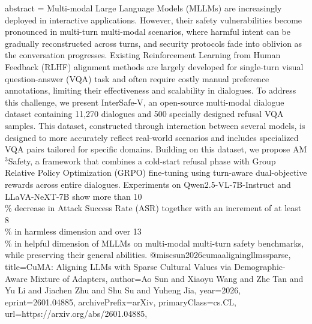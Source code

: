 {      abstract = {Multi-modal Large Language Models (MLLMs) are increasingly deployed in interactive applications. However, their safety vulnerabilities become pronounced in multi-turn multi-modal scenarios, where harmful intent can be gradually reconstructed across turns, and security protocols fade into oblivion as the conversation progresses. Existing Reinforcement Learning from Human Feedback (RLHF) alignment methods are largely developed for single-turn visual question-answer (VQA) task and often require costly manual preference annotations, limiting their effectiveness and scalability in dialogues. To address this challenge, we present InterSafe-V, an open-source multi-modal dialogue dataset containing 11,270 dialogues and 500 specially designed refusal VQA samples. This dataset, constructed through interaction between several models, is designed to more accurately reflect real-world scenarios and includes specialized VQA pairs tailored for specific domains. Building on this dataset, we propose AM$^3$Safety, a framework that combines a cold-start refusal phase with Group Relative Policy Optimization (GRPO) fine-tuning using turn-aware dual-objective rewards across entire dialogues. Experiments on Qwen2.5-VL-7B-Instruct and LLaVA-NeXT-7B show more than 10\\\% decrease in Attack Success Rate (ASR) together with an increment of at least 8\\\% in harmless dimension and over 13\\\% in helpful dimension of MLLMs on multi-modal multi-turn safety benchmarks, while preserving their general abilities.}
}@misc{sun2026cumaaligningllmssparse,
      title={CuMA: Aligning LLMs with Sparse Cultural Values via Demographic-Aware Mixture of Adapters}, 
      author={Ao Sun and Xiaoyu Wang and Zhe Tan and Yu Li and Jiachen Zhu and Shu Su and Yuheng Jia},
      year={2026},
      eprint={2601.04885},
      archivePrefix={arXiv},
      primaryClass={cs.CL},
      url={https://arxiv.org/abs/2601.04885},
}
